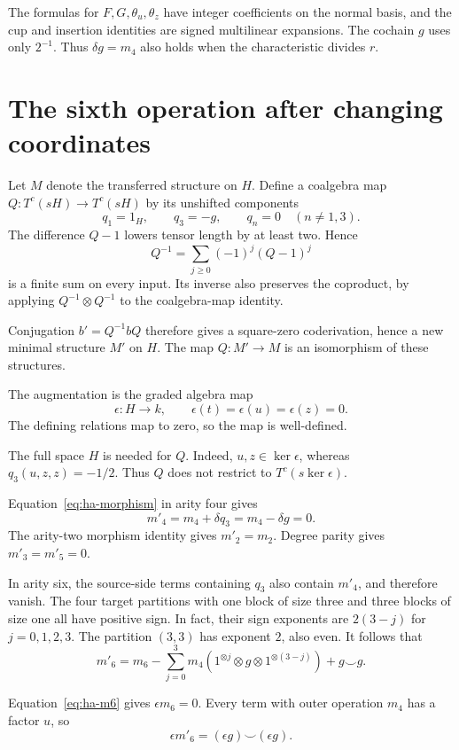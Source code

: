 The formulas for $F,G,\theta_u,\theta_z$ have integer coefficients
on the normal basis, and the cup and insertion identities are signed
multilinear expansions.
The cochain $g$ uses only $2^{-1}$.
Thus $\delta g=m_4$ also holds when the characteristic divides $r$.

\section{The sixth operation after changing coordinates}
\label{sec:ha-coordinate-change}

Let $M$ denote the transferred structure on $H$. Define a coalgebra
map $Q:T^c(sH)\to T^c(sH)$ by its unshifted components
\[
 q_1=1_H,\qquad q_3=-g,\qquad q_n=0\quad(n\ne1,3).
\]
The difference $Q-1$ lowers tensor length by at least two.
Hence
\[
 Q^{-1}=\sum_{j\geq0}(-1)^j(Q-1)^j
\]
is a finite sum on every input. Its inverse also preserves the
coproduct, by applying $Q^{-1}\otimes Q^{-1}$ to the coalgebra-map
identity.

Conjugation $b'=Q^{-1}bQ$ therefore gives a square-zero
coderivation, hence a new minimal structure $M'$ on $H$.
The map $Q:M'\to M$ is an isomorphism of these structures.

The augmentation is the graded algebra map
\[
 \epsilon:H\longrightarrow k,\qquad
 \epsilon(t)=\epsilon(u)=\epsilon(z)=0.
\]
The defining relations map to zero, so the map is well-defined.

The full space $H$ is needed for $Q$.
Indeed, $u,z\in\ker\epsilon$, whereas $q_3(u,z,z)=-1/2$.
Thus $Q$ does not restrict to $T^c(s\ker\epsilon)$.

Equation~\eqref{eq:ha-morphism} in arity four gives
\[
 m'_4=m_4+\delta q_3=m_4-\delta g=0.
\]
The arity-two morphism identity gives $m'_2=m_2$.
Degree parity gives $m'_3=m'_5=0$.

In arity six, the source-side terms containing $q_3$ also contain
$m'_4$, and therefore vanish. The four target partitions with one
block of size three and three blocks of size one all have positive
sign. In fact, their sign exponents are $2(3-j)$ for
$j=0,1,2,3$. The partition $(3,3)$ has exponent $2$, also even.
It follows that
\begin{equation}\label{eq:ha-six-coordinate}
 m'_6=m_6-\sum_{j=0}^3
 m_4(1^{\otimes j}\otimes g\otimes1^{\otimes(3-j)})+g\smile g.
\end{equation}

Equation~\eqref{eq:ha-m6} gives $\epsilon m_6=0$.
Every term with outer operation $m_4$ has a factor $u$, so
\begin{equation}\label{eq:ha-six-augmentation}
 \epsilon m'_6=(\epsilon g)\smile(\epsilon g).
\end{equation}

